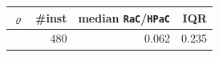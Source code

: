 \begin{tabular}{@{}rrrr@{}}
\toprule
$\varrho$ & \#inst & median \texttt{RaC}/\texttt{HPaC} & IQR \\
\midrule
 & 480 & 0.062 & 0.235 \\
\bottomrule
\end{tabular}
